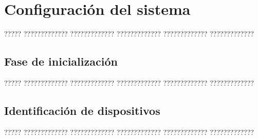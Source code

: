 \documentclass[11pt,spanish,listoffigures,listoftables]{tfgetsinf}
\begin{document}

\cleardoublepage


\APPENDIX





\chapter{Configuración del sistema} \label{ch:configuracion_sistema}

????? ????????????? ????????????? ????????????? ????????????? ?????????????

\section{Fase de inicialización} \label{sec:fase_inicializacion}

????? ????????????? ????????????? ????????????? ????????????? ?????????????

\section{Identificación de dispositivos} \label{sec:identificacion_dispositivos}

????? ????????????? ????????????? ????????????? ????????????? ?????????????

\end{document}
